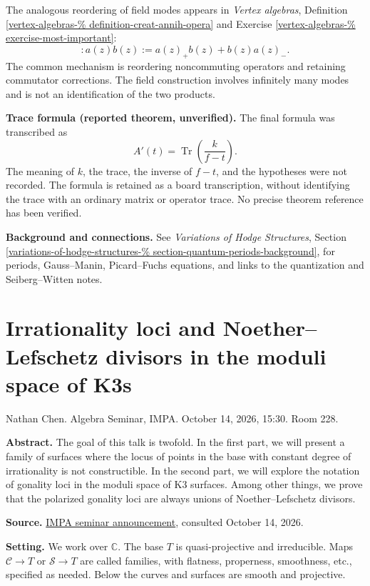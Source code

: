 The analogous reordering of field modes
appears in {\it Vertex algebras},
Definition
\ref{vertex-algebras-%
definition-creat-annih-opera}
and Exercise
\ref{vertex-algebras-%
exercise-most-important}:
$$
:a(z)b(z):=a(z)_+b(z)+b(z)a(z)_-.
$$
The common mechanism is reordering
noncommuting operators and retaining
commutator corrections. The field
construction involves infinitely many
modes and is not an identification of
the two products.

\medskip\noindent
{\bf Trace formula
(reported theorem, unverified).}
The final formula was transcribed as
$$
A'(t)=\operatorname{Tr}
\left(\frac{k}{f-t}\right).
$$
The meaning of $k$, the trace, the inverse
of $f-t$, and the hypotheses were not
recorded. The formula is retained as a
board transcription, without identifying
the trace with an ordinary matrix or
operator trace. No precise theorem
reference has been verified.

\medskip\noindent
{\bf Background and connections.}
See {\it Variations of Hodge Structures},
Section \ref{variations-of-hodge-structures-%
section-quantum-periods-background},
for periods, Gauss--Manin,
Picard--Fuchs equations, and links to
the quantization and Seiberg--Witten notes.

\section{Irrationality loci and
Noether--Lefschetz divisors in the moduli
space of K3s}
\label{section-chen-irrationality-k3}

\noindent
Nathan Chen.
Algebra Seminar, IMPA.
October 14, 2026, 15:30.
Room 228.

\medskip\noindent
{\bf Abstract.}
The goal of this talk is twofold. In the
first part, we will present a family of
surfaces where the locus of points in the
base with constant degree of irrationality is
not constructible. In the second part, we
will explore the notation of gonality loci in
the moduli space of K3 surfaces. Among other
things, we prove that the polarized gonality
loci are always unions of Noether--Lefschetz
divisors.

\medskip\noindent
{\bf Source.}
\href{https://impa.br/seminarios/}
{IMPA seminar announcement},
consulted October 14, 2026.


\medskip\noindent
{\bf Setting.}
We work over $\mathbb{C}$.
The base $T$ is quasi-projective and
irreducible. Maps
$\mathcal{C}\to T$ or $\mathcal{S}\to T$
are called families, with flatness,
properness, smoothness, etc., specified
as needed. Below the curves and surfaces
are smooth and projective.

